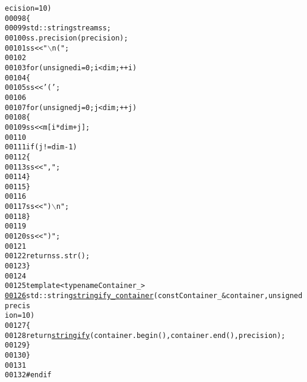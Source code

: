 \begin{footnotesize}
\begin{alltt}
      ecision = 10)
00098     \{
00099         std::stringstream ss;
00100         ss.precision(precision);
00101         ss << \textcolor{stringliteral}{"\(\backslash\)n("};
00102 
00103         \textcolor{keywordflow}{for} (\textcolor{keywordtype}{unsigned} i = 0 ; i < dim ; ++i)
00104         \{
00105             ss << \textcolor{charliteral}{'('};
00106 
00107             \textcolor{keywordflow}{for} (\textcolor{keywordtype}{unsigned} j = 0 ; j < dim ; ++j)
00108             \{
00109                 ss << m[i * dim + j];
00110 
00111                 \textcolor{keywordflow}{if} (j != dim - 1)
00112                 \{
00113                     ss << \textcolor{stringliteral}{", "};
00114                 \}
00115             \}
00116 
00117             ss << \textcolor{stringliteral}{")\(\backslash\)n"};
00118         \}
00119 
00120         ss << \textcolor{stringliteral}{" )"};
00121 
00122         \textcolor{keywordflow}{return} ss.str();
00123     \}
00124 
00125     \textcolor{keyword}{template} <\textcolor{keyword}{typename} Container\_>
\hypertarget{stringify_8hh_source_l00126}{}\hyperlink{namespaceeos_ae90d5cf81cb527f4088dd11daf1e456d}{00126}     std::string \hyperlink{namespaceeos_ae90d5cf81cb527f4088dd11daf1e456d}{stringify_container}(\textcolor{keyword}{const} Container\_ & container, \textcolor{keywordtype}{unsigned} precis
      ion = 10)
00127     \{
00128         \textcolor{keywordflow}{return} \hyperlink{namespaceeos_a4d4fd832aebc28739c76d8cbd3dda6df}{stringify}(container.begin(), container.end(), precision);
00129     \}
00130 \}
00131 
00132 \textcolor{preprocessor}{#endif}
\end{alltt}\end{footnotesize}
